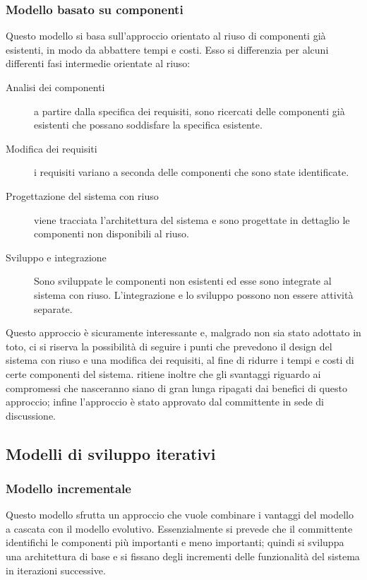 \subsubsection{Modello basato su componenti}
Questo modello si basa sull'approccio orientato al riuso di componenti già esistenti, in modo da abbattere tempi e costi. Esso si differenzia per alcuni differenti fasi intermedie orientate al riuso:
\begin{description}
	\item [Analisi dei componenti] a partire dalla specifica dei requisiti, sono ricercati delle componenti già esistenti che possano soddisfare la specifica esistente.
	\item [Modifica dei requisiti] i requisiti variano a seconda delle componenti che sono state identificate.
	\item [Progettazione del sistema con riuso] viene tracciata l'architettura del sistema e sono progettate in dettaglio le componenti non disponibili al riuso.
	\item [Sviluppo e integrazione] Sono sviluppate le componenti non esistenti ed esse sono integrate al sistema con riuso. L'integrazione e lo sviluppo possono non essere attività separate.
\end{description}

Questo approccio è sicuramente interessante e, malgrado non sia stato adottato in toto, ci si riserva la possibilità di seguire i punti che prevedono il design del sistema con riuso e una modifica dei requisiti, al fine di ridurre i tempi e costi di certe componenti del sistema. \hx{} ritiene inoltre che gli svantaggi riguardo ai compromessi che nasceranno siano di gran lunga ripagati dai benefici di questo approccio; infine l'approccio è stato approvato dal committente in sede di discussione.

\subsection{Modelli di sviluppo iterativi}

\subsubsection{Modello incrementale}
Questo modello sfrutta un approccio che vuole combinare i vantaggi del modello a cascata con il modello evolutivo. Essenzialmente si prevede che il committente identifichi le componenti più importanti e meno importanti; quindi si sviluppa una architettura di base e si fissano degli incrementi delle funzionalità del sistema in iterazioni successive.

